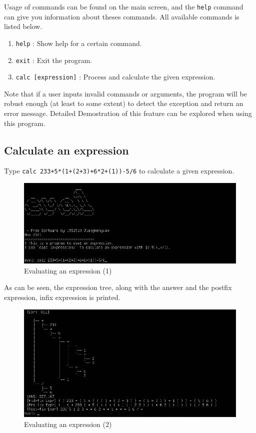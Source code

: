 \documentclass[cn,black,12pt,normal]{elegantnote}
\begin{document}
Usage of commands can be found on the main screen, and the \lstinline{help} command can give you information about theses commands.  All available commands is listed below.

\begin{enumerate}
    \item \lstinline{help} : Show help for a certain command.
    \item \lstinline{exit} : Exit the program.
    \item \lstinline{calc [expression]} : Process and calculate the given expression.
\end{enumerate}
Note that if a user inputs invalid commands or arguments, the program will be robust enough (at least to some extent) to detect the exception and return an error message. Detailed Demostration of this feature can be explored when using this program.

\subsection{Calculate an expression}

Type \lstinline{calc 233+5*(1+(2+3)+6*2+(1))-5/6} to calculate a given expression.

\begin{figure}[H]
    \centering
    \includegraphics[width=0.7\linewidth]{image/e02.jpg}
    \caption{Evaluating an expression (1)}
\end{figure}
As can be seen, the expression tree, along with the answer and the postfix expression, infix expression is printed.
\begin{figure}[H]
    \centering
    \includegraphics[width=0.7\linewidth]{image/e03.jpg}
    \caption{Evaluating an expression (2)}
\end{figure}
\end{document}
